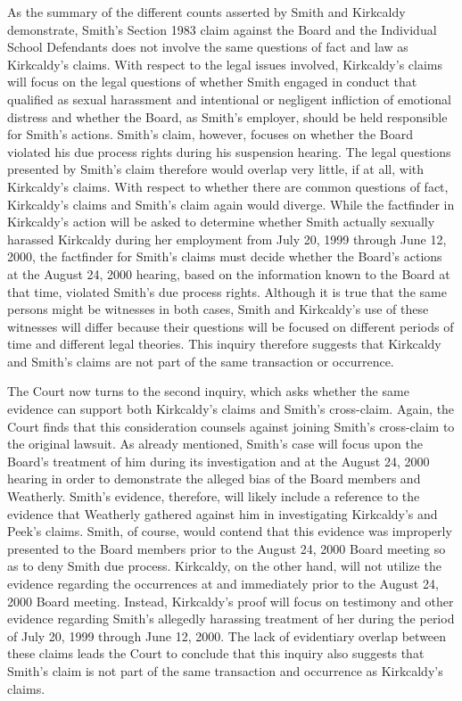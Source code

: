 \documentclass[11pt,letterpaper,twoside]{article}
\begin{document}
As the summary of the different counts asserted by Smith and Kirkcaldy
demonstrate, Smith's Section 1983 claim against the Board and the
Individual School Defendants does not involve the same questions of fact
and law as Kirkcaldy's claims. With respect to the legal issues
involved, Kirkcaldy's claims will focus on the legal questions of
whether Smith engaged in conduct that qualified as sexual harassment and
intentional or negligent infliction of emotional distress and whether
the Board, as Smith's employer, should be held responsible for Smith's
actions. Smith's claim, however, focuses on whether the Board violated
his due process rights during his suspension hearing. The legal
questions presented by Smith's claim therefore would overlap very
little, if at all, with Kirkcaldy's claims. With respect to whether
there are common questions of fact, Kirkcaldy's claims and Smith's claim
again would diverge. While the factfinder in Kirkcaldy's action will be
asked to determine whether Smith actually sexually harassed Kirkcaldy
during her employment from July 20, 1999 through June 12, 2000, the
factfinder for Smith's claims must decide whether the Board's actions at
the August 24, 2000 hearing, based on the information known to the Board
at that time, violated Smith's due process rights. Although it is true
that the same persons might be witnesses in both cases, Smith and
Kirkcaldy's use of these witnesses will differ because their questions
will be focused on different periods of time and different legal
theories. This inquiry therefore suggests that Kirkcaldy and Smith's
claims are not part of the same transaction or occurrence.

The Court now turns to the second inquiry, which asks whether the same
evidence can support both Kirkcaldy's claims and Smith's cross-claim.
Again, the Court finds that this consideration counsels against joining
Smith's cross-claim to the original lawsuit. As already mentioned,
Smith's case will focus upon the Board's treatment of him during its
investigation and at the August 24, 2000 hearing in order to demonstrate
the alleged bias of the Board members and Weatherly. Smith's evidence,
therefore, will likely include a reference to the evidence that
Weatherly gathered against him in investigating Kirkcaldy's and Peek's
claims. Smith, of course, would contend that this evidence was
improperly presented to the Board members prior to the August 24, 2000
Board meeting so as to deny Smith due process. Kirkcaldy, on the other
hand, will not utilize the evidence regarding the occurrences at and
immediately prior to the August 24, 2000 Board meeting. Instead,
Kirkcaldy's proof will focus on testimony and other evidence regarding
Smith's allegedly harassing treatment of her during the period of July
20, 1999 through June 12, 2000. The lack of evidentiary overlap between
these claims leads the Court to conclude that this inquiry also suggests
that Smith's claim is not part of the same transaction and occurrence as
Kirkcaldy's claims.
\end{document}
